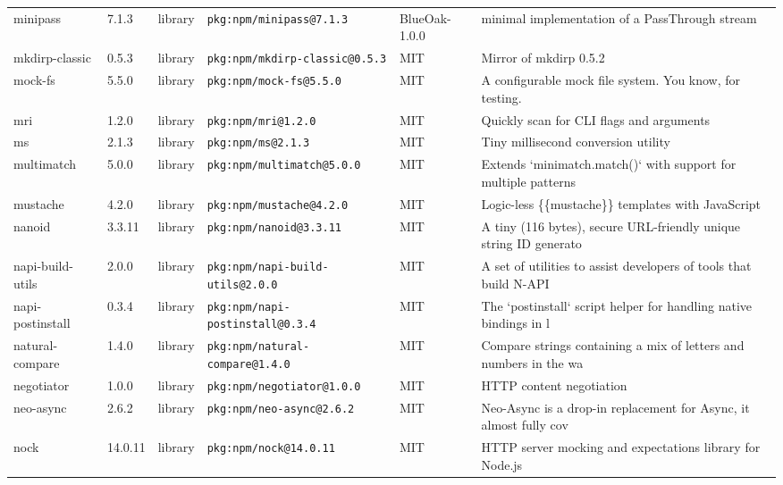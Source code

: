 \documentclass[11pt,a4paper]{article}
\begin{document}
\begin{longtable}{|p{4cm}|p{2cm}|p{1.6cm}|p{5cm}|p{1.5cm}|p{3.5cm}|}
\raggedright minipass & 7.1.3 & library & \small\texttt{pkg:npm/minipass@7.1.3} & BlueOak-1.0.0 & \small minimal implementation of a PassThrough stream \\
\raggedright mkdirp-classic & 0.5.3 & library & \small\texttt{pkg:npm/mkdirp-classic@0.5.3} & MIT & \small Mirror of mkdirp 0.5.2 \\
\raggedright mock-fs & 5.5.0 & library & \small\texttt{pkg:npm/mock-fs@5.5.0} & MIT & \small A configurable mock file system.  You know, for testing. \\
\raggedright mri & 1.2.0 & library & \small\texttt{pkg:npm/mri@1.2.0} & MIT & \small Quickly scan for CLI flags and arguments \\
\raggedright ms & 2.1.3 & library & \small\texttt{pkg:npm/ms@2.1.3} & MIT & \small Tiny millisecond conversion utility \\
\raggedright multimatch & 5.0.0 & library & \small\texttt{pkg:npm/multimatch@5.0.0} & MIT & \small Extends `minimatch.match()` with support for multiple patterns \\
\raggedright mustache & 4.2.0 & library & \small\texttt{pkg:npm/mustache@4.2.0} & MIT & \small Logic-less \{\{mustache\}\} templates with JavaScript \\
\raggedright nanoid & 3.3.11 & library & \small\texttt{pkg:npm/nanoid@3.3.11} & MIT & \small A tiny (116 bytes), secure URL-friendly unique string ID generato \\
\raggedright napi-build-utils & 2.0.0 & library & \small\texttt{pkg:npm/napi-build-utils@2.0.0} & MIT & \small A set of utilities to assist developers of tools that build N-API \\
\raggedright napi-postinstall & 0.3.4 & library & \small\texttt{pkg:npm/napi-postinstall@0.3.4} & MIT & \small The `postinstall` script helper for handling native bindings in l \\
\raggedright natural-compare & 1.4.0 & library & \small\texttt{pkg:npm/natural-compare@1.4.0} & MIT & \small Compare strings containing a mix of letters and numbers in the wa \\
\raggedright negotiator & 1.0.0 & library & \small\texttt{pkg:npm/negotiator@1.0.0} & MIT & \small HTTP content negotiation \\
\raggedright neo-async & 2.6.2 & library & \small\texttt{pkg:npm/neo-async@2.6.2} & MIT & \small Neo-Async is a drop-in replacement for Async, it almost fully cov \\
\raggedright nock & 14.0.11 & library & \small\texttt{pkg:npm/nock@14.0.11} & MIT & \small HTTP server mocking and expectations library for Node.js \\

\end{longtable}
\end{document}

